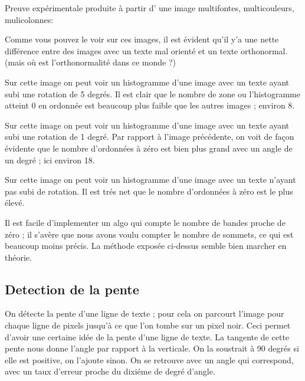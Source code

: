 Preuve exp\'erimentale produite \`a partir d' une image multifontes,
multicouleurs, mulicolonnes:

 Comme vous pouvez le voir sur ces images, il est \'evident qu'il y'a une
 nette diff\'erence entre des images avec un texte mal orient\'e et un
 texte orthonormal. (mais o\`u est l'orthonormalit\'e dans ce monde ?)


Sur cette image on peut voir un histogramme d'une image avec un
texte ayant subi une rotation de 5 degr\'es. Il est clair que le nombre
de zone ou l'histogramme atteint 0 en ordonn\'ee est beaucoup plus faible
que les autres images ; environ 8.



Sur cette image on peut voir un histogramme d'une image avec un texte
ayant subi une rotation de 1 degr\'e. Par rapport \`a l'image
pr\'ec\'edente, on voit de fa\c con \'evidente que le nombre d'ordonn\'ees
\`a z\'ero est bien plus grand avec un angle de un degr\'e ; ici environ 18.


Sur cette image on peut voir un histogramme d'une image avec un texte
n'ayant pas subi de rotation. Il est tr\'es net que le nombre
d'ordonn\'ees \`a z\'ero est le plus \'elev\'e.

Il est facile d'implementer un algo qui compte le nombre de bandes
proche de z\'ero ; il s'av\`ere que nous avons voulu compter le nombre de
sommets, ce qui est beaucoup moins pr\'ecis. La m\'ethode expos\'ee
ci-dessus semble bien marcher en th\'eorie.

\subsection{ Detection de la pente }
On d\'etecte la pente d'une ligne de texte ; pour cela on parcourt
l'image pour chaque ligne de pixels jusqu'\`a ce que l'on tombe sur un
pixel noir. Ceci permet d'avoir une certaine id\'ee de la pente d'une ligne
de texte. La tangente de cette pente nous donne l'angle par rapport \`a
la verticale. On la soustrait \`a 90 degr\'es si elle est positive, on
l'ajoute sinon. On se retrouve avec un angle qui correspond, avec un
taux d'erreur proche du dixi\'eme de degr\'e d'angle.


